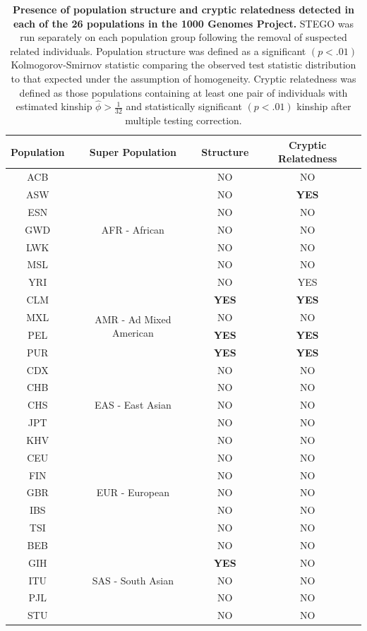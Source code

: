 \begin{table}
\begin{tabular}{|c|c|c|c|}
\hline 
Population & Super Population & Structure & Cryptic Relatedness\tabularnewline
\hline 
\hline 
ACB & \multirow{7}{*}{AFR - African} & NO & NO\tabularnewline
\cline{1-1} \cline{3-4} 
ASW &  & NO & \textbf{YES}\tabularnewline
\cline{1-1} \cline{3-4} 
ESN &  & NO & NO\tabularnewline
\cline{1-1} \cline{3-4} 
GWD &  & NO & NO\tabularnewline
\cline{1-1} \cline{3-4} 
LWK &  & NO & NO\tabularnewline
\cline{1-1} \cline{3-4} 
MSL &  & NO & NO\tabularnewline
\cline{1-1} \cline{3-4} 
YRI &  & NO & YES\tabularnewline
\hline 
CLM & \multirow{4}{*}{AMR - Ad Mixed American} & \textbf{YES} & \textbf{YES}\tabularnewline
\cline{1-1} \cline{3-4} 
MXL &  & NO & NO\tabularnewline
\cline{1-1} \cline{3-4} 
PEL &  & \textbf{YES} & \textbf{YES}\tabularnewline
\cline{1-1} \cline{3-4} 
PUR &  & \textbf{YES} & \textbf{YES}\tabularnewline
\hline 
CDX & \multirow{5}{*}{EAS - East Asian} & NO & NO\tabularnewline
\cline{1-1} \cline{3-4} 
CHB &  & NO & NO\tabularnewline
\cline{1-1} \cline{3-4} 
CHS &  & NO & NO\tabularnewline
\cline{1-1} \cline{3-4} 
JPT &  & NO & NO\tabularnewline
\cline{1-1} \cline{3-4} 
KHV &  & NO & NO\tabularnewline
\hline 
CEU & \multirow{5}{*}{EUR - European} & NO & NO\tabularnewline
\cline{1-1} \cline{3-4} 
FIN &  & NO & NO\tabularnewline
\cline{1-1} \cline{3-4} 
GBR &  & NO & NO\tabularnewline
\cline{1-1} \cline{3-4} 
IBS &  & NO & NO\tabularnewline
\cline{1-1} \cline{3-4} 
TSI &  & NO & NO\tabularnewline
\hline 
BEB & \multirow{5}{*}{SAS - South Asian} & NO & NO\tabularnewline
\cline{1-1} \cline{3-4} 
GIH &  & \textbf{YES} & NO\tabularnewline
\cline{1-1} \cline{3-4} 
ITU &  & NO & NO\tabularnewline
\cline{1-1} \cline{3-4} 
PJL &  & NO & NO\tabularnewline
\cline{1-1} \cline{3-4} 
STU &  & NO & NO\tabularnewline
\hline 
\end{tabular}\caption{\textbf{Presence of population structure and cryptic relatedness detected
in each of the 26 populations in the 1000 Genomes Project.} STEGO
was run separately on each population group following the removal
of suspected related individuals. Population structure was defined
as a significant $\left(p<.01\right)$ Kolmogorov-Smirnov statistic
comparing the observed test statistic distribution to that expected
under the assumption of homogeneity. Cryptic relatedness was defined
as those populations containing at least one pair of individuals with
estimated kinship $\hat{\phi}>\frac{1}{32}$ and statistically significant
$\left(p<.01\right)$ kinship after multiple testing correction. }

\label{population_table}
\end{table}
